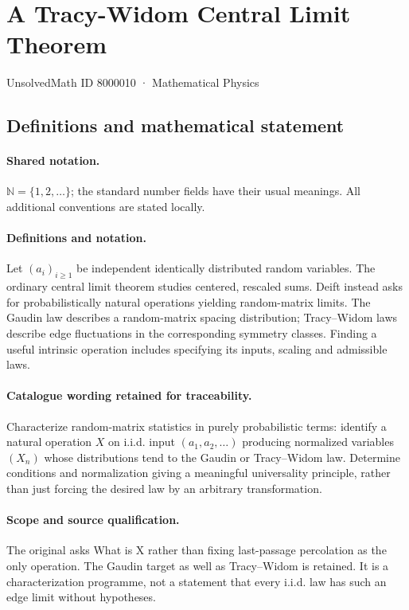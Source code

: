 \documentclass[11pt]{article}
\begin{document}
\setcounter{section}{8000009}
\section{A Tracy-Widom Central Limit Theorem}\label{8000010}
{\small UnsolvedMath ID 8000010 · Mathematical Physics}
\subsection{Definitions and mathematical statement}

\paragraph{Shared notation.}$\mathbb N=\{1,2,\ldots\}$; the standard number fields have their usual meanings. All additional conventions are stated locally.


\paragraph{Definitions and notation.}Let $(a_i)_{i\ge1}$ be independent identically distributed random variables. The ordinary central limit theorem studies centered, rescaled sums. Deift instead asks for probabilistically natural operations yielding random-matrix limits. The Gaudin law describes a random-matrix spacing distribution; Tracy--Widom laws describe edge fluctuations in the corresponding symmetry classes. Finding a useful intrinsic operation includes specifying its inputs, scaling and admissible laws.

\paragraph{Catalogue wording retained for traceability.}
Characterize random-matrix statistics in purely probabilistic terms: identify a natural operation $X$ on i.i.d. input $(a_1,a_2,\ldots)$ producing normalized variables $(X_n)$ whose distributions tend to the Gaudin or Tracy--Widom law. Determine conditions and normalization giving a meaningful universality principle, rather than just forcing the desired law by an arbitrary transformation.
\paragraph{Scope and source qualification.}The original asks What is X rather than fixing last-passage percolation as the only operation. The Gaudin target as well as Tracy–Widom is retained. It is a characterization programme, not a statement that every i.i.d. law has such an edge limit without hypotheses.
\end{document}
